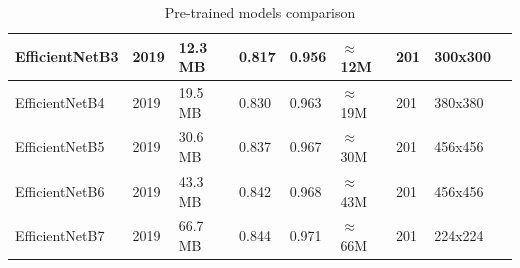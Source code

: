 \begin{table}[h]
\begin{tabularx}{\textwidth}{|l|X|X|X|X|X|X|X|X|}
    	EfficientNetB3 & 2019 & 12.3 MB & 0.817 & 0.956 & $\approx$12M & 201 & 300x300 \\ \hline
    	EfficientNetB4 & 2019 & 19.5 MB & 0.830 & 0.963 & $\approx$19M & 201 & 380x380 \\ \hline
    	EfficientNetB5 & 2019 & 30.6 MB & 0.837 & 0.967 & $\approx$30M & 201 & 456x456 \\ \hline
    	EfficientNetB6 & 2019 & 43.3 MB & 0.842 & 0.968 & $\approx$43M & 201 & 456x456 \\ \hline
    	EfficientNetB7 & 2019 & 66.7 MB & 0.844 & 0.971 & $\approx$66M & 201 & 224x224 \\ \hline
    \end{tabularx}
    \caption{Pre-trained models comparison}
    \label{tables:pretrainedmodels}
\end{table} 

